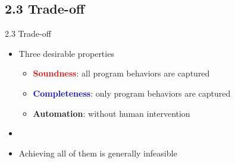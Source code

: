 \documentclass[10pt]{beamer}
\begin{document}
	\subsection{2.3 Trade-off}
	\begin{frame}{2.3 Trade-off}
		\begin{itemize}
			\item Three desirable properties
			\begin{itemize}
				\item \textcolor{red}{\bf Soundness}: all program behaviors are captured
				\item \textcolor{blue}{\bf Completeness}: only program behaviors are captured
				\item \textcolor{green!75!black}{\bf Automation}: without human intervention
			\end{itemize}
			\item[]
			\item Achieving all of them is generally infeasible \\
			\begin{center}\end{center}
		\end{itemize}
	\end{frame}
\end{document}
